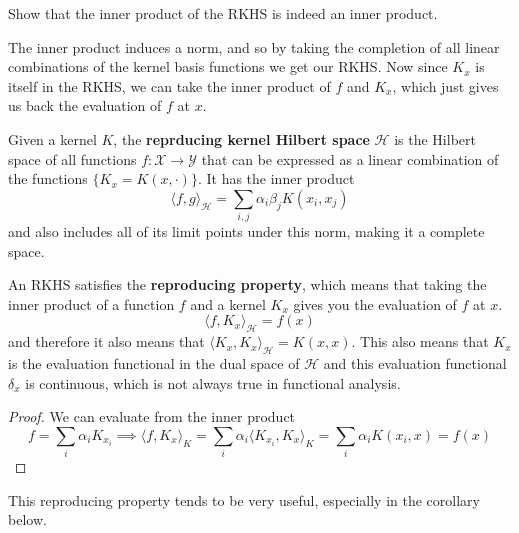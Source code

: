   \begin{exercise}
    Show that the inner product of the RKHS is indeed an inner product.
  \end{exercise}

  The inner product induces a norm, and so by taking the completion of all linear combinations of the kernel basis functions we get our RKHS. Now since $K_x$ is itself in the RKHS, we can take the inner product of $f$ and $K_x$, which just gives us back the evaluation of $f$ at $x$. 

  \begin{definition}
    Given a kernel $K$, the \textbf{reprducing kernel Hilbert space} $\mathcal{H}$ is the Hilbert space of all functions $f: \mathcal{X} \rightarrow \mathcal{Y}$ that can be expressed as a linear combination of the functions $\{K_x = K(x, \cdot)\}$. It has the inner product 
    \begin{equation}
      \langle f, g \rangle_{\mathcal{H}} = \sum_{i, j} \alpha_i \beta_j K(x_i, x_j)
    \end{equation}
    and also includes all of its limit points under this norm, making it a complete space. 
  \end{definition}

  \begin{theorem}
    An RKHS satisfies the \textbf{reproducing property}, which means that taking the inner product of a function $f$ and a kernel $K_x$ gives you the evaluation of $f$ at $x$. 
    \begin{equation}
      \langle f, K_x \rangle_{\mathcal{H}} = f(x)
    \end{equation}
    and therefore it also means that $\langle K_x, K_x \rangle_{\mathcal{H}} = K(x, x)$. This also means that $K_x$ is the evaluation functional in the dual space of $\mathcal{H}$ and this evaluation functional $\delta_x$ is continuous, which is not always true in functional analysis.  
  \end{theorem}
  \begin{proof}
    We can evaluate from the inner product 
    \begin{equation}
      f = \sum_i \alpha_i K_{x_i} \implies \langle f, K_x \rangle_K = \sum_i \alpha_i \langle K_{x_i}, K_x \rangle_K = \sum_i \alpha_i K(x_i, x) = f(x)
    \end{equation}
  \end{proof}

  This reproducing property tends to be very useful, especially in the corollary below. 

